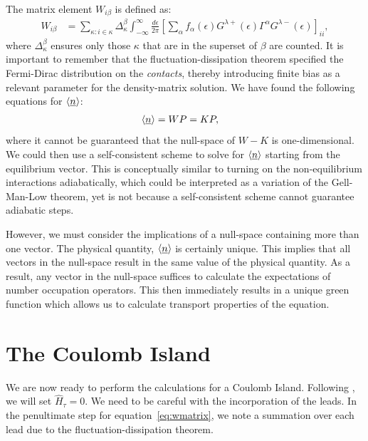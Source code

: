 \documentclass{article}
\begin{document}
\begin{multicols}{2}
        The matrix element $W_{i\beta}$ is defined as:
        \begin{align*}
        W_{i\beta} &= \sum_{\kappa: i \in \kappa} \Delta^\beta_\kappa \int^\infty_{-\infty} \frac{d\epsilon}{2\pi} \left[ \sum_\alpha f_\alpha(\epsilon) G^{\lambda+}(\epsilon) \Gamma^\alpha G^{\lambda-} (\epsilon)\right]_{ii},
        \end{align*} where $\Delta^\beta_\kappa$ ensures only those $\kappa$ that are in the superset of $\beta$ are counted. It is important to remember that the fluctuation-dissipation theorem specified the Fermi-Dirac distribution on the \emph{contacts}, thereby introducing finite bias as a relevant parameter for the density-matrix solution. We have found the following equations for $\braket{\underline{n}}$:
        \begin{align}
            \braket{\underline{n}} &= WP = KP\label{eq:selfconsistent},
        \end{align}
        where it cannot be guaranteed that the null-space of $W-K$ is one-dimensional. We could then use a self-consistent scheme to solve for $\braket{\underline{n}}$ starting from the equilibrium vector. This is conceptually similar to turning on the non-equilibrium interactions adiabatically, which could be interpreted as a variation of the Gell-Man-Low theorem\cite{gellmannlow, molinari}, yet is not because a self-consistent scheme cannot guarantee adiabatic steps.
        
        However, we must consider the implications of a null-space containing more than one vector. The physical quantity, $\braket{\underline{n}}$ is certainly unique. This implies that all vectors in the null-space result in the same value of the physical quantity. As a result, any vector in the null-space suffices to calculate the expectations of number occupation operators. This then immediately results in a unique green function which allows us to calculate transport properties of the equation.

    \section{The Coulomb Island}\label{sec:island}
        We are now ready to perform the calculations for a Coulomb Island. Following \citet{haugjauho}, we will set $\hat{H}_\tau = 0$. We need to be careful with the incorporation of the leads. In the penultimate step for equation~\ref{eq:wmatrix}, we note a summation over each lead due to the fluctuation-dissipation theorem. 
        

\end{multicols}
\end{document}
